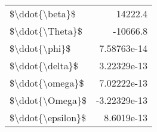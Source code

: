 \begin{tabular}{lr}
\hline
 \$\textbackslash{}ddot\{\textbackslash{}beta\}\$    &  14222.4         \\
 \$\textbackslash{}ddot\{\textbackslash{}Theta\}\$   & -10666.8         \\
 \$\textbackslash{}ddot\{\textbackslash{}phi\}\$     &      7.58763e-14 \\
 \$\textbackslash{}ddot\{\textbackslash{}delta\}\$   &      3.22329e-13 \\
 \$\textbackslash{}ddot\{\textbackslash{}omega\}\$   &      7.02222e-13 \\
 \$\textbackslash{}ddot\{\textbackslash{}Omega\}\$   &     -3.22329e-13 \\
 \$\textbackslash{}ddot\{\textbackslash{}epsilon\}\$ &      8.6019e-13  \\
\hline
\end{tabular}